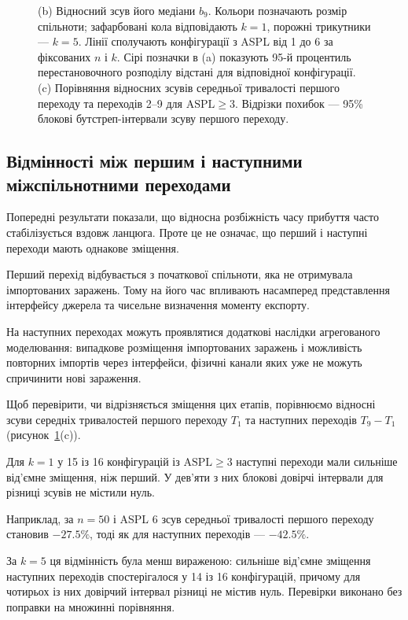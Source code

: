 \documentclass[a4paper,fleqn]{cas-sc}
\begin{document}
\begin{figure}[tbp]
{(b) Відносний зсув його медіани $b_9$.
Кольори позначають розмір спільноти;
зафарбовані кола відповідають $k=1$,
порожні трикутники --- $k=5$.
Лінії сполучають конфігурації
з ASPL від 1 до 6 за фіксованих
$n$ і $k$. Сірі позначки в (a)
показують 95-й процентиль
перестановочного розподілу
відстані для відповідної конфігурації.
(c) Порівняння відносних зсувів
середньої тривалості першого
переходу та переходів 2--9
для $\mathrm{ASPL}\geq3$.
Відрізки похибок --- 95\%
блокові бутстреп-інтервали
зсуву першого переходу.
}
\label{fig:descriptor}
\end{figure}


\subsection{Відмінності між першим
і наступними міжспільнотними переходами}

Попередні результати показали,
що відносна розбіжність часу
прибуття часто стабілізується
вздовж ланцюга.
Проте це не означає,
що перший і наступні переходи
мають однакове зміщення.

Перший перехід відбувається
з початкової спільноти,
яка не отримувала імпортованих
заражень. Тому на його час
впливають насамперед
представлення інтерфейсу
джерела та чисельне
визначення моменту експорту.

На наступних переходах
можуть проявлятися
додаткові наслідки
агрегованого моделювання:
випадкове розміщення
імпортованих заражень
і можливість повторних
імпортів через інтерфейси,
фізичні канали яких
уже не можуть спричинити
нові зараження.

Щоб перевірити, чи відрізняється
зміщення цих етапів,
порівнюємо відносні зсуви
середніх тривалостей
першого переходу $T_1$
та наступних переходів
$T_9-T_1$
(рисунок~\ref{fig:descriptor}(c)).

Для $k=1$ у 15 із 16
конфігурацій із
$\mathrm{ASPL}\geq3$
наступні переходи мали
сильніше від'ємне зміщення,
ніж перший.
У дев'яти з них
блокові довірчі інтервали
для різниці зсувів
не містили нуль.

Наприклад, за $n=50$
і ASPL 6 зсув середньої
тривалості першого переходу
становив $-27.5\%$,
тоді як для наступних
переходів --- $-42.5\%$.

За $k=5$ ця відмінність
була менш вираженою:
сильніше від'ємне
зміщення наступних
переходів спостерігалося
у 14 із 16 конфігурацій,
причому для чотирьох
із них довірчий інтервал
різниці не містив нуль.
Перевірки виконано
без поправки на множинні
порівняння.
\end{document}
